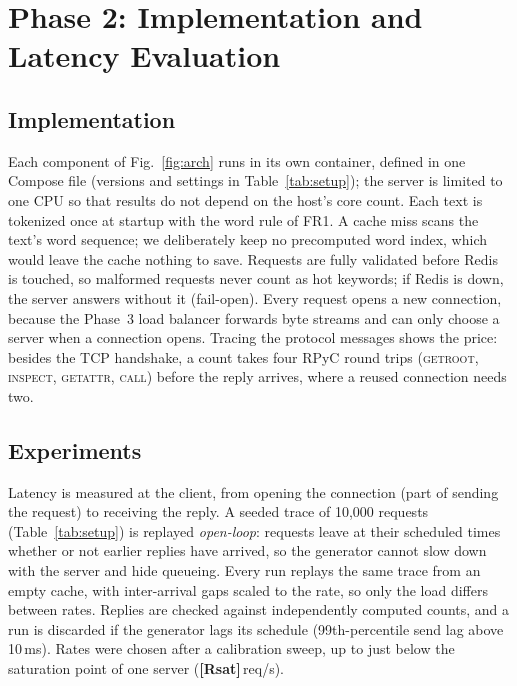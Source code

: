 \section{Phase 2: Implementation and Latency Evaluation}\label{sec:impl}

\subsection{Implementation}
Each component of Fig.~\ref{fig:arch} runs in its own container, defined in one
Compose file (versions and settings in Table~\ref{tab:setup}); the server is
limited to one CPU so that results do not depend on the host's core count. Each
text is tokenized once at startup with the word rule of FR1. A cache miss scans
the text's word sequence; we deliberately keep no precomputed word index, which
would leave the cache nothing to save. Requests are fully validated before Redis
is touched, so malformed requests never count as hot keywords; if Redis is down,
the server answers without it (fail-open). Every request opens a new connection,
because the Phase~3 load balancer forwards byte streams and can only choose a
server when a connection opens. Tracing the protocol messages shows the price:
besides the TCP handshake, a count takes four RPyC round trips (\textsc{getroot},
\textsc{inspect}, \textsc{getattr}, \textsc{call}) before the reply arrives,
where a reused connection needs two.

\subsection{Experiments}
Latency is measured at the client, from opening the connection (part of sending
the request) to receiving the reply. A seeded trace of 10{,}000 requests
(Table~\ref{tab:setup}) is replayed \emph{open-loop}: requests leave at their
scheduled times whether or not earlier replies have arrived, so the generator
cannot slow down with the server and hide queueing. Every run replays the same
trace from an empty cache, with inter-arrival gaps scaled to the rate, so only the
load differs between rates. Replies are checked against independently computed
counts, and a run is discarded if the generator lags its schedule (99th-percentile
send lag above 10\,ms). Rates were chosen after a calibration sweep, up to just
below the saturation point of one server (\textbf{[Rsat]}\,req/s).

